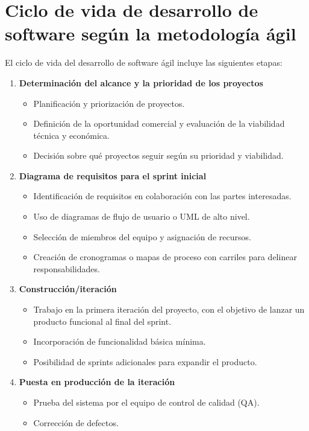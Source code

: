 \documentclass{article}
\begin{document}
\section{Ciclo de vida de desarrollo de software según la metodología ágil}
El ciclo de vida del desarrollo de software ágil incluye las siguientes etapas:
\begin{enumerate}
    \item \textbf{Determinación del alcance y la prioridad de los proyectos}
    \begin{itemize}
        \item Planificación y priorización de proyectos.
        \item Definición de la oportunidad comercial y evaluación de la viabilidad técnica y económica.
        \item Decisión sobre qué proyectos seguir según su prioridad y viabilidad.
    \end{itemize}
    \item \textbf{Diagrama de requisitos para el sprint inicial}
    \begin{itemize}
        \item Identificación de requisitos en colaboración con las partes interesadas.
        \item Uso de diagramas de flujo de usuario o UML de alto nivel.
        \item Selección de miembros del equipo y asignación de recursos.
        \item Creación de cronogramas o mapas de proceso con carriles para delinear responsabilidades.
    \end{itemize}
    \item \textbf{Construcción/iteración}
    \begin{itemize}
        \item Trabajo en la primera iteración del proyecto, con el objetivo de lanzar un producto funcional al final del sprint.
        \item Incorporación de funcionalidad básica mínima.
        \item Posibilidad de sprints adicionales para expandir el producto.
    \end{itemize}
    \item \textbf{Puesta en producción de la iteración}
    \begin{itemize}
        \item Prueba del sistema por el equipo de control de calidad (QA).
        \item Corrección de defectos.

\end{itemize}
\end{enumerate}
\end{document}
